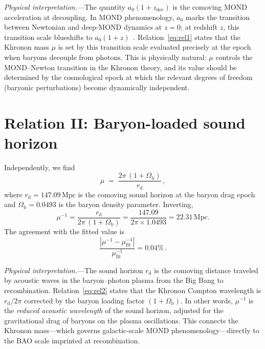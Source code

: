 \documentclass[prl,twocolumn,superscriptaddress,longbibliography]{revtex4-2}
\newcommand{\Mpc}{\,\mathrm{Mpc}}
\newcommand{\zdec}{z_{\mathrm{dec}}}
\newcommand{\rd}{r_{\mathrm{d}}}
\newcommand{\Ob}{\Omega_{\mathrm{b}}}
\begin{document}
\emph{Physical interpretation.}---The
quantity $a_0(1 + \zdec)$ is the
comoving MOND acceleration at decoupling.
In MOND phenomenology, $a_0$ marks
the transition between Newtonian and deep-MOND
dynamics at $z = 0$; at redshift $z$, this transition
scale blueshifts to $a_0(1 + z)$~\cite{Milgrom2020}.
Relation~\eqref{eq:rel1} states that the Khronon
mass $\mu$ is set by this transition scale evaluated
precisely at the epoch when baryons decouple from
photons.
This is physically natural: $\mu$ controls the
MOND--Newton transition in the Khronon theory,
and its value should be determined by the
cosmological epoch at which the relevant degrees
of freedom (baryonic perturbations) become
dynamically independent.


\section{Relation II: Baryon-loaded sound horizon}
\label{sec:rel2}

Independently, we find
\begin{equation}
  \mu \;=\; \frac{2\pi\,(1 + \Ob)}{\rd} \,,
  \label{eq:rel2}
\end{equation}
where $\rd = 147.09\Mpc$ is the comoving sound
horizon at the baryon drag epoch~\cite{Planck2018}
and $\Ob = 0.0493$ is the baryon density
parameter.  Inverting,
\begin{equation}
  \mu^{-1}
  = \frac{\rd}{2\pi\,(1 + \Ob)}
  = \frac{147.09}{2\pi \times 1.0493}
  = 22.31\Mpc .
  \label{eq:rel2_value}
\end{equation}
The agreement with the fitted value is
\begin{equation}
  \frac{|\mu^{-1} - \mu^{-1}_{\mathrm{fit}}|}
       {\mu^{-1}_{\mathrm{fit}}}
  = 0.04\% \,.
\end{equation}

\emph{Physical interpretation.}---The
sound horizon $\rd$ is the comoving distance
traveled by acoustic waves in the baryon--photon
plasma from the Big Bang to recombination.
Relation~\eqref{eq:rel2} states that the Khronon
Compton wavelength is $\rd / 2\pi$ corrected by
the baryon loading factor $(1 + \Ob)$.
In other words, $\mu^{-1}$ is the
\emph{reduced acoustic wavelength} of the sound
horizon, adjusted for the gravitational drag of
baryons on the plasma oscillations.
This connects the Khronon mass---which governs
galactic-scale MOND phenomenology---directly to the
BAO scale imprinted at recombination.
\end{document}
